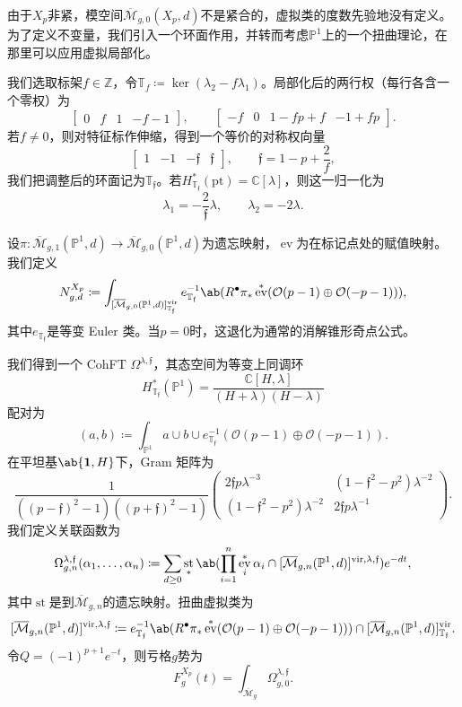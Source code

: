 \documentclass{amsart}
\theoremstyle{definition}
\theoremstyle{remark}
\theoremstyle{plain}
\theoremstyle{definition}
\theoremstyle{remark}
\newcommand{\C}{\mathbb{C}}
\newcommand{\Z}{\mathbb{Z}}
\renewcommand{\P}{\mathbb{P}}
\newcommand{\Mbar}{\overline{\mathcal{M}}}
\newcommand{\mc}[1]{\mathcal{#1}}
\newcommand{\T}{\mathbb{T}}
\newcommand{\mf}[1]{\mathfrak{#1}}
\newcommand{\mr}[1]{\mathrm{#1}}
\newcommand{\1}{\mathbf{1}}
\newcommand{\2}{\mathbf{2}}
\newcommand{\3}{\mathbf{3}}
\newcommand{\vir}{\mr{vir}}
\DeclareMathOperator{\ev}{ev}
\DeclareMathOperator{\st}{st}
\begin{document}
由于\(X_p\)非紧，模空间\(\Mbar_{g,0}(X_p,d)\)不是紧合的，虚拟类的度数先验地没有定义。为了定义不变量，我们引入一个环面作用，并转而考虑\(\P^1\)上的一个扭曲理论，在那里可以应用虚拟局部化。

我们选取标架\(f \in \Z\)，令\(\T_f \coloneqq \ker(\lambda_2 - f\lambda_1)\)。局部化后的两行权（每行各含一个零权）为
\[ \begin{bmatrix} 0 & f & 1 & -f-1 \end{bmatrix}, \qquad \begin{bmatrix} -f & 0 & 1-fp+f & -1+fp \end{bmatrix}. \]
若\(f \neq 0\)，则对特征标作伸缩，得到一个等价的对称权向量
\[ \begin{bmatrix} 1 & -1 & -\mf{f} & \mf{f} \end{bmatrix}, \qquad \mf{f} = 1-p+\frac{2}{f}, \]
我们把调整后的环面记为\(\T_{\mf{f}}\)。若\(H^*_{\T_{\mf{f}}}(\mr{pt}) = \C[\lambda]\)，则这一归一化为
\[ \lambda_1 = -\frac{2}{\mf{f}}\lambda, \qquad \lambda_2 = -2\lambda. \]

设\(\pi \colon \Mbar_{g,1}(\P^1,d) \to \Mbar_{g,0}(\P^1,d)\)为遗忘映射，\(\ev\)为在标记点处的赋值映射。我们定义
\[ N^{X_p}_{g,d} \coloneqq \int_{[\Mbar_{g,0}(\P^1,d)]^{\vir}_{\T_{\mf{f}}}} e_{\T_{\mf{f}}}^{-1}\ab(R^{\bullet}\pi_* \ev^*(\mc{O}(p-1)\oplus\mc{O}(-p-1))), \]
其中\(e_{\T_{\mf{f}}}\)是等变 Euler 类。当\(p=0\)时，这退化为通常的消解锥形奇点公式。

我们得到一个 CohFT \(\Omega^{\lambda,\mf{f}}\)，其态空间为等变上同调环
\[ H^*_{\T_{\mf{f}}}(\P^1) = \frac{\C[H,\lambda]}{(H+\lambda)(H-\lambda)} \]
配对为
\[ (a,b) \coloneqq \int_{\P^1} a \cup b \cup e^{-1}_{\T_{\mf{f}}}(\mc{O}(p-1)\oplus\mc{O}(-p-1)). \]
在平坦基\(\ab\{\1,H\}\)下，Gram 矩阵为
\[ \frac{1}{((p-\mf{f})^2-1)((p+\mf{f})^2-1)}\begin{pmatrix} 2\mf{f}p\lambda^{-3} & (1-\mf{f}^2-p^2)\lambda^{-2} \\ (1-\mf{f}^2-p^2)\lambda^{-2} & 2\mf{f}p\lambda^{-1} \end{pmatrix}. \]
我们定义关联函数为
\[ \Omega^{\lambda,\mf{f}}_{g,n}(\alpha_1,\ldots,\alpha_n) \coloneqq \sum_{d\geq0}\st_*\ab(\prod_{i=1}^n \ev_i^*\alpha_i \cap [\Mbar_{g,n}(\P^1,d)]^{\vir,\lambda,\mf{f}})e^{-dt}, \]
其中\(\st\)是到\(\Mbar_{g,n}\)的遗忘映射。扭曲虚拟类为
\[ [\Mbar_{g,n}(\P^1,d)]^{\vir,\lambda,\mf{f}} \coloneqq e^{-1}_{\T_{\mf{f}}}\ab(R^{\bullet}\pi_*\ev^*(\mc{O}(p-1)\oplus\mc{O}(-p-1))) \cap [\Mbar_{g,n}(\P^1,d)]^{\vir}_{\T_{\mf{f}}}. \]
令\(Q = (-1)^{p+1}e^{-t}\)，则亏格\(g\)势为
\[ F^{X_p}_g(t) = \int_{\Mbar_g} \Omega^{\lambda,\mf{f}}_{g,0}. \]
\end{document}
